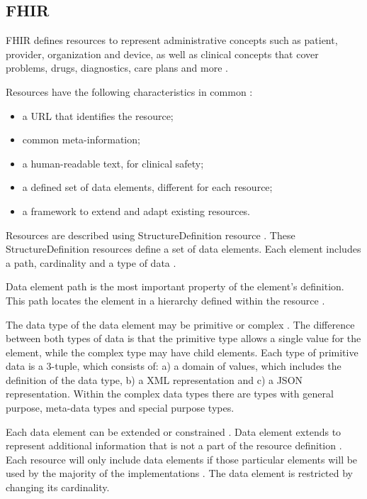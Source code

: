 \subsection{FHIR}

FHIR defines resources to represent administrative concepts such as patient, provider, organization and device, as well as clinical concepts that cover problems, drugs, diagnostics, care plans and more \cite{FHIRResourceList}.

Resources have the following characteristics in common \cite{FHIRDeveloper}:
\begin{itemize}
  \item a URL that identifies the resource;
  \item common meta-information;
  \item a human-readable text, for clinical safety;
  \item a defined set of data elements, different for each resource;
  \item a framework to extend and adapt existing resources.
\end{itemize}

Resources are described using StructureDefinition resource \cite{FHIRStructureDefinition}. These StructureDefinition resources define a set of data elements. Each element includes a path, cardinality and a type of data \cite{FHIRElementDefinition}.

Data element path is the most important property of the element's definition. This path locates the element in a hierarchy defined within the resource \cite{FHIRElementDefinition}.

The data type of the data element may be primitive or complex  \cite{FHIRDataTypes}. The difference between both types of data is that the primitive type allows a single value for the element, while the complex type may have child elements. Each type of primitive data is a 3-tuple, which consists of: a) a domain of values, which includes the definition of the data type, b) a XML representation and c) a JSON representation. Within the complex data types there are types with general purpose, meta-data types and special purpose types.

Each data element can be extended or constrained \cite{FHIRProfiling}. Data element extends to represent additional information that is not a part of the resource definition \cite{FHIRExtensibility}. Each resource will only include data elements if those particular elements will be used by the majority of the implementations \cite{FHIRArchitecture}. The data element is restricted by changing its cardinality.


